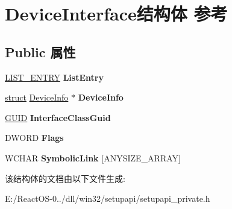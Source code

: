 \hypertarget{struct_device_interface}{}\section{Device\+Interface结构体 参考}
\label{struct_device_interface}
\subsection*{Public 属性}
\begin{DoxyCompactItemize}
\item 
\mbox{\label{struct_device_interface_aaed338d691a536dd294017cb02b451f3}} 
\hyperlink{struct___l_i_s_t___e_n_t_r_y}{L\+I\+S\+T\+\_\+\+E\+N\+T\+RY} {\bfseries List\+Entry}
\item 
\mbox{\label{struct_device_interface_a4fc4abdfeee133493785961378556ef8}} 
\hyperlink{interfacestruct}{struct} \hyperlink{struct_device_info}{Device\+Info} $\ast$ {\bfseries Device\+Info}
\item 
\mbox{\label{struct_device_interface_ab33c11f065d3ce4b3dec04336a532129}} 
\hyperlink{interface_g_u_i_d}{G\+U\+ID} {\bfseries Interface\+Class\+Guid}
\item 
\mbox{\label{struct_device_interface_ab02f9a916eaf938a7b46a5778c19c982}} 
D\+W\+O\+RD {\bfseries Flags}
\item 
\mbox{\label{struct_device_interface_a8b28dfb433f4bc0d011c815f15851ec5}} 
W\+C\+H\+AR {\bfseries Symbolic\+Link} \mbox{[}A\+N\+Y\+S\+I\+Z\+E\+\_\+\+A\+R\+R\+AY\mbox{]}
\end{DoxyCompactItemize}


该结构体的文档由以下文件生成\+:\begin{DoxyCompactItemize}
\item 
E\+:/\+React\+O\+S-\/0../dll/win32/setupapi/setupapi\+\_\+private.\+h\end{DoxyCompactItemize}
